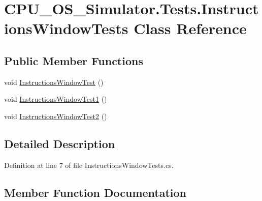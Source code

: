 \hypertarget{class_c_p_u___o_s___simulator_1_1_tests_1_1_instructions_window_tests}{}\section{C\+P\+U\+\_\+\+O\+S\+\_\+\+Simulator.\+Tests.\+Instructions\+Window\+Tests Class Reference}
\label{class_c_p_u___o_s___simulator_1_1_tests_1_1_instructions_window_tests}
\subsection*{Public Member Functions}
\begin{DoxyCompactItemize}
\item 
void \hyperlink{class_c_p_u___o_s___simulator_1_1_tests_1_1_instructions_window_tests_a2b346fb408ca259eae0f0ea8601329a2}{Instructions\+Window\+Test} ()
\item 
void \hyperlink{class_c_p_u___o_s___simulator_1_1_tests_1_1_instructions_window_tests_aeaf3021b4b5db5d689a153354defea18}{Instructions\+Window\+Test1} ()
\item 
void \hyperlink{class_c_p_u___o_s___simulator_1_1_tests_1_1_instructions_window_tests_ac2b4b0a184b5d0f43e817465f0b11217}{Instructions\+Window\+Test2} ()
\end{DoxyCompactItemize}


\subsection{Detailed Description}


Definition at line 7 of file Instructions\+Window\+Tests.\+cs.



\subsection{Member Function Documentation}
\hypertarget{class_c_p_u___o_s___simulator_1_1_tests_1_1_instructions_window_tests_a2b346fb408ca259eae0f0ea8601329a2}{}
